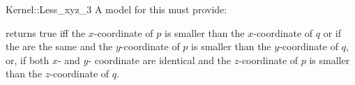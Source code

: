 \begin{ccRefFunctionObjectConcept}{Kernel::Less_xyz_3}
A model for this must provide:


{returns true iff the $x$-coordinate of $p$ is smaller than the
$x$-coordinate of $q$ or if the are the same and 
the $y$-coordinate of $p$ is smaller than the $y$-coordinate of $q$, or,
if both $x$- and $y$- coordinate are identical and
the $z$-coordinate of $p$ is smaller than the $z$-coordinate of $q$.}

\end{ccRefFunctionObjectConcept}

